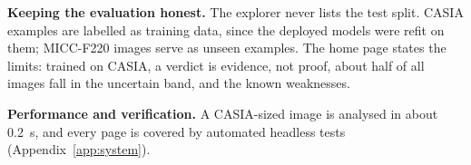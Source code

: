 \textbf{Keeping the evaluation honest.} The explorer never lists the test split. CASIA examples are labelled as
training data, since the deployed models were refit on them; MICC-F220 images serve as unseen examples. The home page
states the limits: trained on CASIA, a verdict is evidence, not proof, about half of all images fall in the uncertain
band, and the known weaknesses.

\textbf{Performance and verification.} A CASIA-sized image is analysed in about 0.2~s, and every page is covered by
automated headless tests (Appendix~\ref{app:system}).
